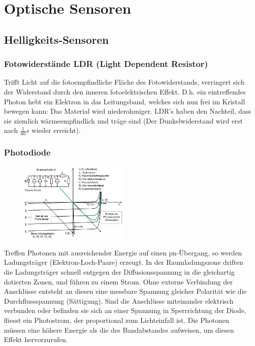 \section{Optische Sensoren}
\subsection{Helligkeits-Sensoren}
\subsubsection{Fotowiderstände LDR (Light Dependent Resistor)}
Trifft Licht auf die fotoempfindliche Fläche des Fotowiderstands, verringert sich der Widerstand durch den inneren fotoelektrischen Effekt. D.h. ein eintreffendes Photon hebt ein Elektron in das Leitungsband, welches sich nun frei im Kristall bewegen kann: Das Material wird niederohmiger. LDR's haben den Nachteil, dass sie ziemlich wärmeempfindlich und träge sind (Der Dunkelwiderstand wird erst nach $\frac{1}{60}s$ wieder erreicht).

\subsubsection{Photodiode}
\begin{figure}
    \vspace{-12pt}
    \centering
    \includegraphics[width=0.48\textwidth]{images/photodiode}
\end{figure}
Treffen Photonen mit ausreichender Energie auf einen pn-Übergang, so werden Ladungsträger (Elektron-Loch-Paare) erzeugt. In der Raumladungszone driften die Ladungsträger schnell entgegen der Diffusionsspannung in die gleichartig dotierten Zonen, und führen zu einem Strom. Ohne externe Verbindung der Anschlüsse entsteht an diesen eine messbare Spannung gleicher Polarität wie die Durchflussspannung (Sättigung). Sind die Anschlüsse miteinander elektrisch verbunden oder befinden sie sich an einer Spannung in Sperrrichtung der Diode, fliesst ein Photostrom, der proportional zum Lichteinfall ist. Die Photonen müssen eine höhere Energie als die des Bandabstandes aufweisen, um diesen Effekt hervorzurufen.

